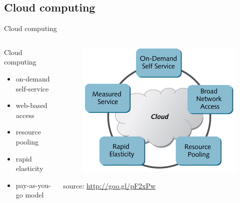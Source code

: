 \subsection{Cloud computing}
\begin{frame}{Cloud computing}
	\only<1>
	{
		\begin{columns}
			\begin{column}{0.5\textwidth}
				Cloud computing
				\begin{itemize}
					\item{\footnotesize{on-demand self-service}}
					\item{\footnotesize{web-based access}}
					\item{\footnotesize{resource pooling}}
					\item{\footnotesize{rapid elasticity}}
					\item{\footnotesize{pay-as-you-go model}}
				\end{itemize}
			\end{column}
			\begin{column}{0.5\textwidth}
				\begin{figure}
					\centering{}
					\includegraphics[scale=0.25]{images/cloud-characteristics.png}
				\end{figure}
				\begin{flushright}
					\tiny{source: \url{http://goo.gl/pF2xPw}}
				\end{flushright}
			\end{column}
		\end{columns}
	}

\end{frame}
